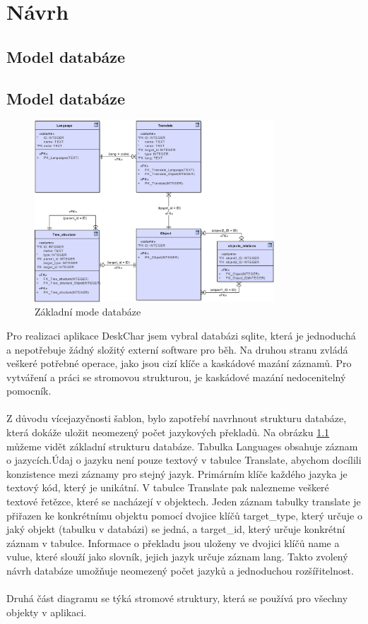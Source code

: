 \documentclass[thesis=B,czech]{resources/FITthesis}[2012/06/26]
\begin{document}
\chapter{Návrh}
	\section{Model databáze}
	\section{Model databáze}
	\begin{figure}\centering
	\includegraphics[width=0.8\textwidth]{images/database_basic}
	\caption[Základní model databáze]{Základní mode databáze}\label{fig:db_basic}
	\end{figure}
	Pro realizaci aplikace DeskChar jsem vybral databázi sqlite, která je jednoduchá a nepotřebuje žádný složitý externí software pro běh. Na druhou stranu zvládá veškeré potřebné operace, jako jsou cizí klíče a kaskádové mazání záznamů. Pro vytváření a práci se stromovou strukturou, je kaskádové mazání nedocenitelný pomocník. \\
\\
Z důvodu vícejazyčnosti šablon, bylo zapotřebí navrhnout strukturu databáze, která dokáže uložit neomezený počet jazykových překladů. Na obrázku \ref{fig:db_basic} můžeme vidět základní strukturu databáze. Tabulka Languages obsahuje záznam o jazycích.Údaj o jazyku není pouze textový v tabulce Translate, abychom docílili konzistence mezi záznamy pro stejný jazyk. Primárním klíče každého jazyka je textový kód, který je unikátní. V tabulce Translate pak nalezneme veškeré textové řetězce, které se nacházejí v objektech. Jeden záznam tabulky translate je přiřazen ke konkrétnímu objektu pomocí dvojice klíčů target\_type, který určuje o jaký objekt (tabulku v databázi) se jedná, a target\_id, který určuje konkrétní záznam v tabulce. Informace o překladu jsou uloženy ve dvojici klíčů name a vulue, které slouží jako slovník, jejich jazyk určuje záznam lang. Takto zvolený návrh databáze umožňuje neomezený počet jazyků a jednoduchou rozšířitelnost.\\
\\
Druhá část diagramu se týká stromové struktury, která se používá pro všechny objekty v aplikaci. 
\end{document}
